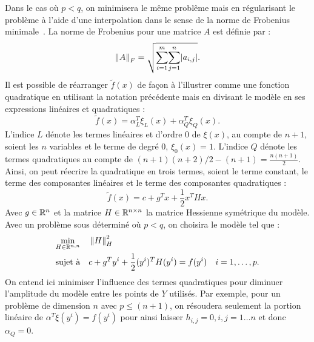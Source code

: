 	Dans le cas où $p<q$, on minimisera le même problême mais en régularisant le problème à l'aide d'une interpolation dans le sense de la norme de Frobenius minimale~\cite{MoWi2009,CuRoVi10}. La norme de Frobenius pour une matrice $A$ est définie par : 
	\begin{equation*}
	\left\lVert A\right\rVert_F = \sqrt{\overset{m}{\underset{i=1}{\sum}} \overset{n}{\underset{j=1}{\sum}}|a_{i,j}|}.
	\end{equation*}
	Il est possible de réarranger $\tilde{f}(x)$ de façon à l'illustrer comme une fonction quadratique en utilisant la notation précédente mais en divisant le modèle en ses expressions linéaires et quadratiques : 
	\begin{equation*}
	\tilde{f}(x) = \alpha_{L}^{T}\xi_L(x) + \alpha_{Q}^{T}\xi_Q(x).
	\end{equation*}
	L'indice $L$ dénote les termes linéaires et d'ordre 0 de $\xi(x)$, au compte de $n+1$, soient les $n$ variables et le terme de degré 0, $\xi_0(x)=1$. L'indice $Q$ dénote les termes quadratiques au compte de $(n+1)(n+2)/2 - (n+1) = \frac{n(n+1)}{2}$. Ainsi, on peut réecrire la quadratique en trois termes, soient le terme constant, le terme des composantes linéaires et le terme des composantes quadratiques : 
	\begin{equation*}
	\tilde{f}(x) = c + g^T x + \frac{1}{2} x^T H x.
	\end{equation*}
	Avec $g \in \mathbb{R}^n$ et la matrice $H\in \mathbb{R}^{n\times n}$ la matrice Hessienne symétrique du modèle. Avec un problème sous déterminé où $p<q$, on choisira le modèle tel que :
	\begin{align*}
	&\underset{H \in \mathbb{R}^{n,n}}{\min}& &\left\lVert H\right\rVert^2_H & &\\
	&\text{sujet à} & &c + g^T y^i + \frac{1}{2} (y^i)^T H (y^i) = f(y^i) & &i = 1,\dots, p.
	\end{align*}
	On entend ici minimiser l'influence des termes quadratiques pour diminuer l'amplitude du modèle entre les points de $Y$ utilisés. Par exemple, pour un problème de dimension $n$ avec $p\leq(n+1)$, on résoudera seulement la portion linéaire de $\alpha ^T \xi(y^i) = f(y^i)$ pour ainsi laisser $h_{i,j}=0, i,j=1\dots n$ et donc $\alpha_{Q}=0$.
